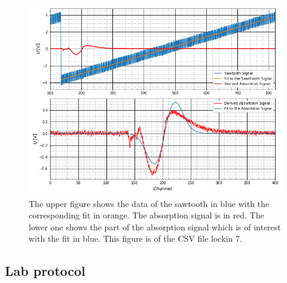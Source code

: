 	\begin{figure}[ht]
		\includegraphics[scale=0.5]{Bild/LockIn7.png}
		\centering
		\caption[Plots and Fits of Lock-In Method 7]{\small The upper figure shows the data of the sawtooth in blue with the corresponding fit in orange. The absorption signal is in red. The lower one shows the part of the absorption signal which is of interest with the fit in blue. This figure is of the CSV file lockin 7.}
		\label{Lock7}
	\end{figure}
\FloatBarrier
	\subsection{Lab protocol}
	